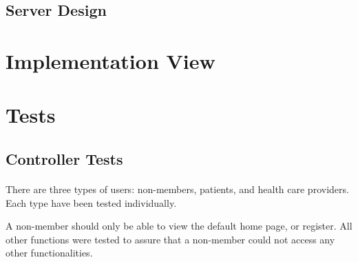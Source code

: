 \documentclass[12pt]{report}
\begin{document}
\subsection{Server Design}

\section{Implementation View}

\section{Tests}

\subsection{Controller Tests}

\paragraph{} 
There are three types of users: non-members, patients, and health care providers. Each type have been tested individually.

A non-member should only be able to view the default home page, or register. All other functions were tested to assure that a non-member could not access any other functionalities. 
\end{document}
